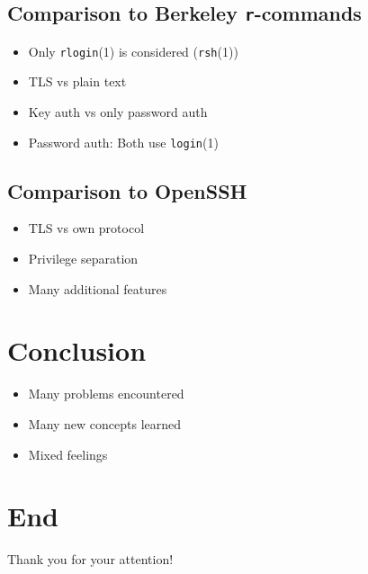 \documentclass[
	xcolor=dvipsnames,
]{beamer}
\newenvironment{zhawframe}[1][]
{\begin{frame}[environment=fr,#1]{\insertsectionhead}{\insertsubsectionhead}}
{\end{frame}
}
\begin{document}
\subsection{Comparison to Berkeley \texttt{r}-commands}
\begin{zhawframe}
\begin{itemize}
\item<1-> Only \texttt{rlogin}(1) is considered (\texttt{rsh}(1))
\item<2-> TLS vs plain text
\item<3-> Key auth vs only password auth
\item<4-> Password auth: Both use \texttt{login}(1)
\end{itemize}
\end{zhawframe}

\subsection{Comparison to OpenSSH}
\begin{zhawframe}
\begin{itemize}
\item<1-> TLS vs own protocol
\item<2-> Privilege separation
\item<3-> Many additional features
\end{itemize}
\end{zhawframe}

\section{Conclusion}
\begin{zhawframe}
\begin{itemize}
\item<1-> Many problems encountered
\item<2-> Many new concepts learned
\item<3-> Mixed feelings
\end{itemize}
\end{zhawframe}

\section{End}
\begin{zhawframe}
Thank you for your attention!
\end{zhawframe}
\end{document}
